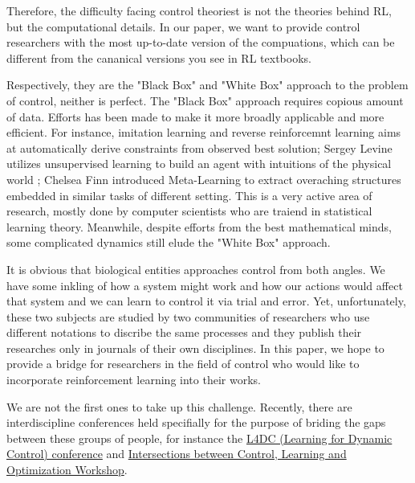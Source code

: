 \documentclass[journal]{IEEEtran}
\begin{document}
Therefore, the difficulty facing control theoriest is not the theories behind RL, but the computational details. In our paper, we want to provide control researchers with the most up-to-date version of the compuations, which can be different from the cananical versions you see in RL textbooks.



Respectively, they are the "Black Box" and "White Box" approach to the problem of control, neither is perfect. The "Black Box" approach requires copious amount of data. Efforts has been made to make it more broadly applicable and more efficient. For instance, imitation learning and reverse reinforcemnt learning \cite{Ho2016GenerativeAI} aims at automatically derive constraints from observed best solution; Sergey Levine utilizes unsupervised learning to build an agent with intuitions of the physical world \cite{Finn2016UnsupervisedLF}; Chelsea Finn introduced Meta-Learning \cite{Finn2017ModelAgnosticMF} to extract overaching structures embedded in similar tasks of different setting. This is a very active area of research, mostly done by computer scientists who are traiend in statistical learning theory. Meanwhile, despite efforts from the best mathematical minds, some complicated dynamics still elude the "White Box" approach.

It is obvious that biological entities approaches control from both angles. We have some inkling of how a system might work and how our actions would affect that system and we can learn to control it via trial and error. Yet, unfortunately, these two subjects are studied by two communities of researchers who use different notations to discribe the same processes and they publish their researches only in journals of their own disciplines. In this paper, we hope to provide a bridge for researchers in the field of control who would like to incorporate reinforcement learning into their works.

We are not the first ones to take up this challenge. Recently, there are interdiscipline conferences held specifially for the purpose of briding the gaps between these groups of people, for instance the \href{https://l4dc.mit.edu/}{L4DC (Learning for Dynamic Control) conference} and \href{https://www.ipam.ucla.edu/programs/workshops/intersections-between-control-learning-and-optimization/}{Intersections between Control, Learning and Optimization Workshop}.
\end{document}
